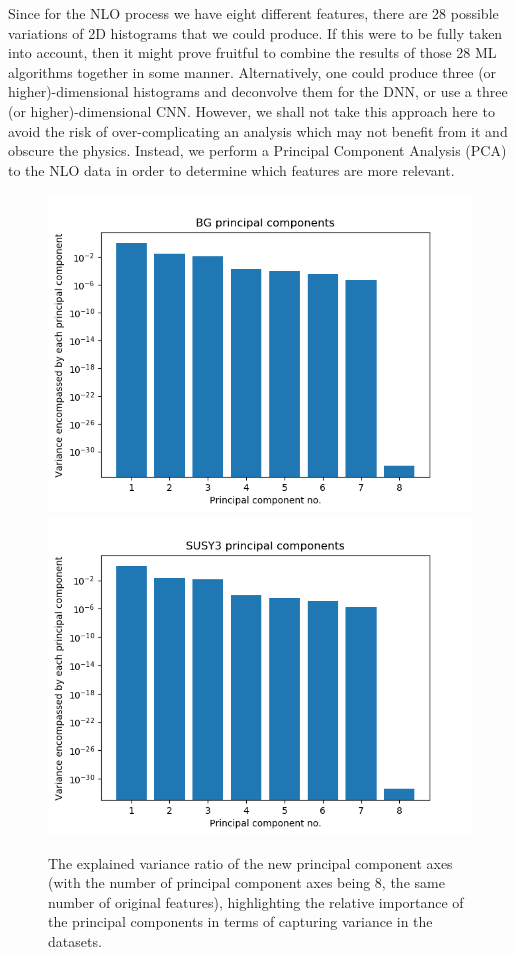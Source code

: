 \documentclass[prd,aps,letterpaper,floatfix,superscriptaddress,preprintnumbers,twocolumn,10pt,nofootinbib]{revtex4-1}
\begin{document}
Since for the NLO process we have eight different features, there are 28 possible variations of 2D histograms that we could produce. If this were to be fully taken into account, then it might prove fruitful to combine the results of those 28 ML algorithms together in some manner. Alternatively, one could produce three (or higher)-dimensional histograms and deconvolve them for the DNN, or use a three (or higher)-dimensional CNN. However, we shall not take this approach here to avoid the risk of over-complicating an analysis which may not benefit from it and obscure the physics. Instead, we perform a Principal Component Analysis (PCA) to the NLO data in order to determine which features are more relevant.

\begin{figure}%
\centering
\includegraphics[scale=0.26]{figures/BG_PCA.png}
\includegraphics[scale=0.26]{figures/SUSY3_PCA.png}
\caption{The explained variance ratio of the new principal component axes (with the number of principal component axes being 8, the same number of original features), highlighting the relative importance of the principal components in terms of capturing variance in the datasets.}\label{PCA_plots1}
\end{figure}
\end{document}
